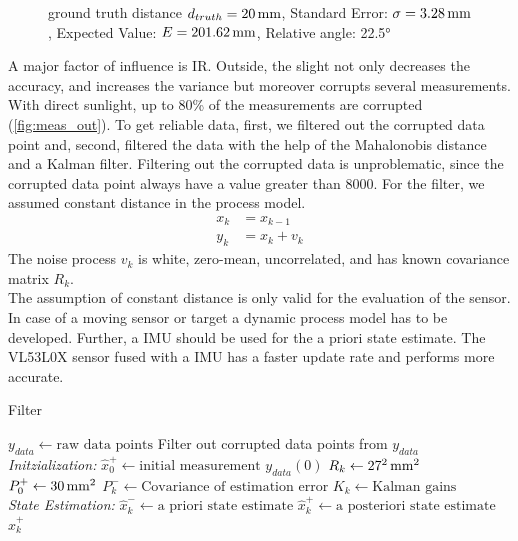 \begin{figure}
\begin{minipage}{0.3\textwidth}
		\caption{ground truth distance $d_{truth}= \unit[20]{mm}$, Standard Error: $\sigma=\unit[3.28]{mm}$, Expected Value: $E=\unit[201.62]{mm}$, Relative angle: 22.5°}
		\label{fig:angl22.5}
	\end{minipage}
\end{figure}

A major factor of influence is IR. Outside, the slight not only decreases the accuracy, and increases the variance but moreover corrupts several measurements. With direct sunlight, up to 80\% of the measurements are corrupted (\cref{fig:meas_out}). To get reliable data, first, we filtered out the corrupted data point and, second, filtered the data with the help of the Mahalonobis distance and a Kalman filter. Filtering out the corrupted data is unproblematic, since the corrupted data point always have a value greater than 8000. For the filter, we assumed constant distance in the process model. 
\begin{equation}
	\label{eq:filter}
	\begin{split} 
	x_k & = x_{k-1} \\
	y_k & = x_k + v_k
	\end{split}
\end{equation}
The noise process $v_k$ is white, zero-mean, uncorrelated, and has known covariance matrix  $R_k$.\\
The assumption of constant distance is only valid for the evaluation of the sensor. In case of a moving sensor or target a dynamic process model has to be developed. Further, a IMU should be used for the a priori state estimate. The VL53L0X sensor fused with a IMU has a faster update rate and performs more accurate. \\

\begin{algorithm}
	\caption{Filter}\label{alg:filter}
	\begin{algorithmic}[1]
		\State $y_{data}\gets \text{raw data points}$ 
		\State Filter out corrupted data points from $y_{data}$ \\
		\textit{Initzialization:}
		\State $\hat{x}^+_0\gets\text{initial measurement }y_{data}(0)$
		\State $R_k\gets\unit[27^2]{mm^2}$ 
		\State $P^+_0\gets \unit[30]{mm^2}$ 
		\For{ each $k = (0, \text{ number of data point]}$}	
			\State  $P^-_k \gets \text{Covariance of estimation error}$
			\State	$K_k \gets \text{Kalman gains}$
		\EndFor \\
		\textit{State Estimation:}	 
		\For{ each $k = (0, \text{ number of data point]}$}
			\State {} 
			\State $\hat{x}^-_k \gets \text{a priori state estimate}$
			\State $\hat{x}^+_k \gets \text{a posteriori state estimate}$
		\EndFor
		\State \Return $\hat{x}^+_k$
		\EndProcedure

	\end{algorithmic}
\end{algorithm}


